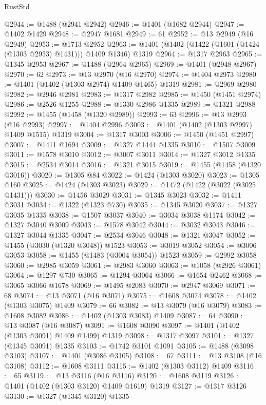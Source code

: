 \begin{lexlean}{RustStd}
\begin{coremodule}
@2944 := @1488 (@2941 @2942)
@2946 := @1401 (@1682 @2944)
@2947 := @1402 @1429
@2948 := @2947 @1681
@2949 := 61
@2952 := @13 @2949 (@16 @2949)
@2953 := @1713 @2952
@2963 := @1401 (@1402 (@1422 (@1601 (@1424 (@1303 @2953) @1431))) @1409 @1346) @1319
@2964 := @1317 @2963
@2965 := @1345 @2953
@2967 := @1488 (@2964 @2965)
@2969 := @1401 (@2948 @2967)
@2970 := 62
@2973 := @13 @2970 (@16 @2970)
@2974 := @1404 @2973
@2980 := @1401 (@1402 (@1303 @2974) @1409 @1465) @1319
@2981 := @2969 @2980
@2982 := @2946 @2981
@2983 := @1317 @2982
@2985 := @1450 (@1451 @2974)
@2986 := @2526 @1255
@2988 := @1330 @2986 @1335
@2989 := @1321 @2988
@2992 := @1455 (@1458 (@1320 @2989))
@2993 := 63
@2996 := @13 @2993 (@16 @2993)
@2997 := @1404 @2996
@3003 := @1401 (@1402 (@1303 @2997) @1409 @1515) @1319
@3004 := @1317 @3003
@3006 := @1450 (@1451 @2997)
@3007 := @1411 @1694
@3009 := @1327 @1444 @1335
@3010 := @1507 @3009
@3011 := @1578 @3010
@3012 := @3007 @3011
@3014 := @1327 @3012 @1335
@3015 := @2534 @3014
@3016 := @1321 @3015
@3019 := @1455 (@1458 (@1320 @3016))
@3020 := @1305 @84
@3022 := @1424 (@1303 @3020)
@3023 := @1305 @160
@3025 := @1424 (@1303 @3023)
@3029 := @1472 (@1422 (@3022 (@3025 @1431)))
@3030 := @1456 @3029
@3031 := @1345 @3023
@3032 := @1411 @3031
@3034 := @1322 (@1323 @730)
@3035 := @1345 @3020
@3037 := @1327 @3035 @1335
@3038 := @1507 @3037
@3040 := @3034 @3038 @1174
@3042 := @1327 @3040 @3009
@3043 := @1578 @3042
@3044 := @3032 @3043
@3046 := @1327 @3044 @1335
@3047 := @2534 @3046
@3048 := @1321 @3047
@3052 := @1455 (@3030 (@1320 @3048)) @1523
@3053 := @3019 @3052
@3054 := @3006 @3053
@3058 := @1455 (@1483 (@3004 @3054)) @1523
@3059 := @2992 @3058
@3060 := @2985 @3059
@3061 := @2983 @3060
@3063 := @1058 (@2926 @3061)
@3064 := @1297 @730
@3065 := @1294 @3064
@3066 := @1654 @2462
@3068 := @3065 @3066 @1678
@3069 := @1495 @2083
@3070 := @2947 @3069
@3071 := 68
@3074 := @13 @3071 (@16 @3071)
@3075 := @1608 @3074
@3078 := @1402 (@1303 @3075) @1409
@3079 := 66
@3082 := @13 @3079 (@16 @3079)
@3083 := @1608 @3082
@3086 := @1402 (@1303 @3083) @1409
@3087 := 64
@3090 := @13 @3087 (@16 @3087)
@3091 := @1608 @3090
@3097 := @1401 (@1402 (@1303 @3091) @1409 @1499) @1319
@3098 := @1317 @3097
@3101 := @1327 (@1345 @3091) @1335
@3103 := @1742 @3101 @1091
@3105 := @1488 (@3098 @3103)
@3107 := @1401 (@3086 @3105)
@3108 := 67
@3111 := @13 @3108 (@16 @3108)
@3112 := @1608 @3111
@3115 := @1402 (@1303 @3112) @1409
@3116 := 65
@3119 := @13 @3116 (@16 @3116)
@3120 := @1608 @3119
@3126 := @1401 (@1402 (@1303 @3120) @1409 @1619) @1319
@3127 := @1317 @3126
@3130 := @1327 (@1345 @3120) @1335

\end{coremodule}
\end{lexlean}

